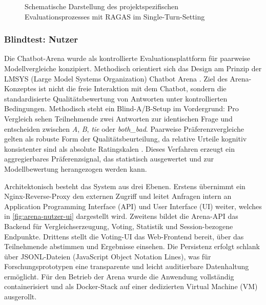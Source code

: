 \begin{figure}[H]
{
}
\caption{Schematische Darstellung des projektspezifischen Evaluationsprozesses mit RAGAS im Single-Turn-Setting}
\label{fig:ragas-eval}
\end{figure}

\subsubsection{Blindtest: Nutzer}
Die Chatbot-Arena wurde als kontrollierte Evaluationsplattform für paarweise Modellvergleiche konzipiert. Methodisch orientiert sich das Design am Prinzip der LMSYS (Large Model Systems Organization) Chatbot Arena \cite{Zheng2023LMSYSArena}. Ziel des Arena-Konzeptes ist nicht die freie Interaktion mit dem Chatbot, sondern die standardisierte Qualitätsbewertung von Antworten unter kontrollierten Bedingungen. Methodisch steht ein Blind-A/B-Setup im Vordergrund: Pro Vergleich sehen Teilnehmende zwei Antworten zur identischen Frage und entscheiden zwischen \textit{A}, \textit{B}, \textit{tie} oder \textit{both\_bad}. Paarweise Präferenzvergleiche gelten als robuste Form der Qualitätsbeurteilung, da relative Urteile kognitiv konsistenter sind als absolute Ratingskalen \cite{Thurstone1927ComparativeJudgment,BradleyTerry1952PairedComparisons}. Dieses Verfahren erzeugt ein aggregierbares Präferenzsignal, das statistisch ausgewertet und zur Modellbewertung herangezogen werden kann.

Architektonisch besteht das System aus drei Ebenen. Erstens übernimmt ein Nginx-Reverse-Proxy den externen Zugriff und leitet Anfragen intern an Application Programming Interface (API) und User Interface (UI) weiter, welches in \autoref{fig:arena-nutzer-ui} dargestellt wird. Zweitens bildet die Arena-API das Backend für Vergleichserzeugung, Voting, Statistik und Session-bezogene Endpunkte. Drittens stellt die Voting-UI das Web-Frontend bereit, über das Teilnehmende abstimmen und Ergebnisse einsehen. Die Persistenz erfolgt schlank über JSONL-Dateien (JavaScript Object Notation Lines), was für Forschungsprototypen eine transparente und leicht auditierbare Datenhaltung ermöglicht. Für den Betrieb der Arena wurde die Anwendung vollständig containerisiert und als Docker-Stack auf einer dedizierten Virtual Machine (VM) ausgerollt.

